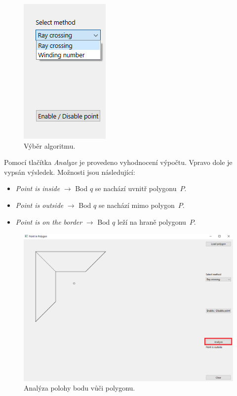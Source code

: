 \documentclass[a4paper, 12pt, oneside, titlepage]{article} %
\begin{document}
\begin{figure}[!htb]
	\centering
	\includegraphics[scale=0.8]{obrazky/select_met.png} 
	\caption{Výběr algoritmu.
	}
	\label{fig:select_met}
\end{figure} 
\FloatBarrier

Pomocí tlačítka \emph{Analyze} je provedeno vyhodnocení výpočtu. Vpravo dole je vypsán výsledek. Možnosti jsou následující:
\begin{itemize}
\item \emph{Point is inside} $\longrightarrow$ Bod $q$ se nachází uvnitř polygonu~$P$.
\item \emph{Point is outside} $\longrightarrow$ Bod $q$ se nachází mimo polygon~$P$.
\item \emph{Point is on the border} $\longrightarrow$ Bod $q$ leží na hraně polygonu~$P$.
\end{itemize}

\begin{figure}[!htb]
	\centering
	\includegraphics[scale=0.5]{obrazky/app_analyze.png} 
	\caption{Analýza polohy bodu vůči polygonu.
	}
	\label{fig:app_analyze}
\end{figure} 
\FloatBarrier
\end{document}
